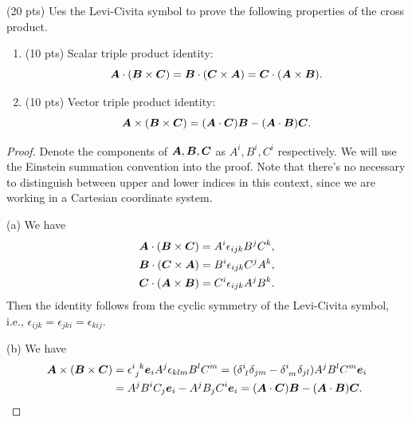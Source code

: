 \documentclass{article}
\begin{document}
\begin{problem}
    (20 pts) Ues the Levi-Civita symbol to prove the following properties of the cross product.
    \begin{enumerate}[label=(\alph*)]
        \item (10 pts) Scalar triple product identity:
        \[ \boldsymbol{A}\cdot(\boldsymbol{B}\times\boldsymbol{C})=\boldsymbol{B}\cdot(\boldsymbol{C}\times\boldsymbol{A})=\boldsymbol{C}\cdot(\boldsymbol{A}\times\boldsymbol{B}). \] 
        \item (10 pts) Vector triple product identity:
        \[ \boldsymbol{A}\times(\boldsymbol{B}\times\boldsymbol{C})=(\boldsymbol{A}\cdot\boldsymbol{C})\boldsymbol{B}-(\boldsymbol{A}\cdot\boldsymbol{B})\boldsymbol{C}. \]
    \end{enumerate}
\end{problem}

\begin{proof}
    Denote the components of \( \boldsymbol{A},\boldsymbol{B},\boldsymbol{C} \) as \( A^i,B^i,C^i \) respectively. We will use the Einstein summation convention into the proof. Note that there's no necessary to distinguish between upper and lower indices in this context, since we are working in a Cartesian coordinate system.\par
    (a) We have
    \[ \begin{aligned}
        \boldsymbol{A}\cdot(\boldsymbol{B}\times\boldsymbol{C}) &=A^i\epsilon_{ijk}B^jC^k,\\
        \boldsymbol{B}\cdot(\boldsymbol{C}\times\boldsymbol{A}) &=B^i\epsilon_{ijk}C^jA^k,\\
        \boldsymbol{C}\cdot(\boldsymbol{A}\times\boldsymbol{B}) &=C^i\epsilon_{ijk}A^jB^k.
    \end{aligned} \]
    Then the identity follows from the cyclic symmetry of the Levi-Civita symbol, i.e., \( \epsilon_{ijk}=\epsilon_{jki}=\epsilon_{kij} \).\par
    (b) We have
    \[ \begin{aligned}
        \bo{A}\times(\bo{B}\times\bo{C}) &=\epsilon\indices{^i_j^k}\bo{e}_iA^j\epsilon_{klm}B^lC^m
        =(\delta\indices{^i_{l}}\delta_{jm}-\delta\indices{^i_{m}}\delta_{jl})A^jB^lC^m\bo{e}_i\\
        &=A^jB^iC_j\bo{e}_i-A^jB_jC^i\bo{e}_i
        =(\bo{A}\cdot\bo{C})\bo{B}-(\bo{A}\cdot\bo{B})\bo{C}.
    \end{aligned} \]

\end{proof}
\end{document}
